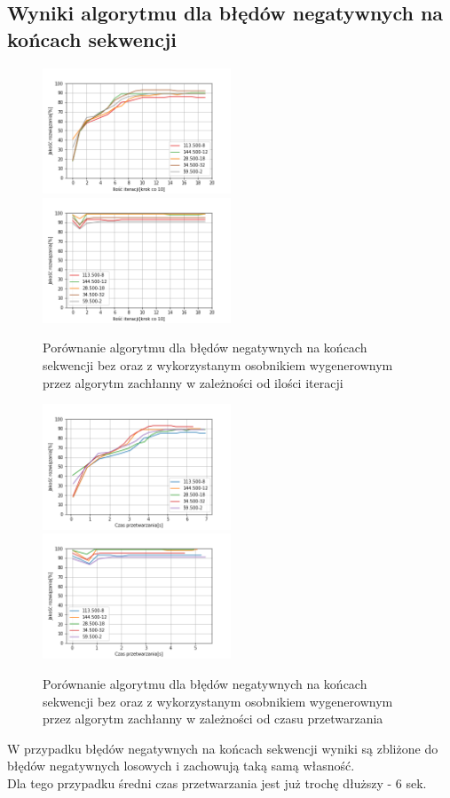 \documentclass{article}
\begin{document}
\subsection{Wyniki algorytmu dla błędów negatywnych na końcach sekwencji}
\begin{figure}[H]
\includegraphics[width=0.5\textwidth]{neg-pow1.png}
\includegraphics[width=0.5\textwidth]{neg-pow-greedy1.png}
\caption{Porównanie algorytmu dla błędów negatywnych na końcach sekwencji bez oraz z wykorzystanym osobnikiem wygenerownym przez algorytm zachłanny w zależności od ilości iteracji}
\end{figure}
\begin{figure}[H]
\includegraphics[width=0.5\textwidth]{Czasneg-pow1.png}
\includegraphics[width=0.5\textwidth]{Czasneg-pow-greedy1.png}
\caption{Porównanie algorytmu dla błędów negatywnych na końcach sekwencji bez oraz z wykorzystanym osobnikiem wygenerownym przez algorytm zachłanny w zależności od czasu przetwarzania}
\end{figure}
W przypadku  błędów negatywnych na końcach sekwencji wyniki są zbliżone do błędów negatywnych losowych i zachowują taką samą własność. \\Dla tego przypadku średni czas przetwarzania jest już trochę dłuższy - 6 sek. 
\end{document}
